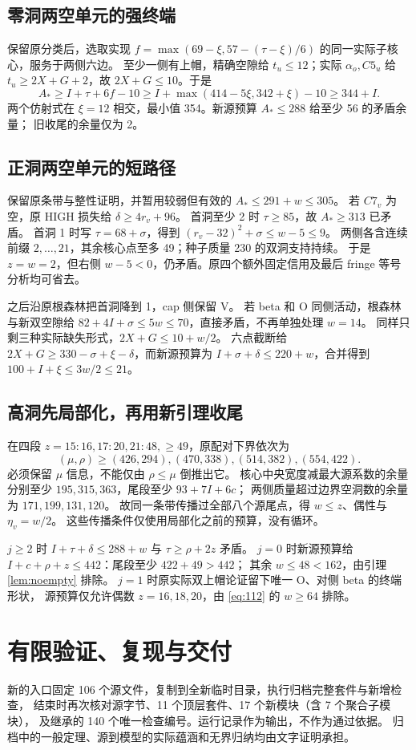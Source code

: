 \documentclass[11pt,a4paper]{article}
\newcommand{\A}{A_*}
\begin{document}
\subsection*{零洞两空单元的强终端}
保留原分类后，选取实现 $f=\max(69-\xi,57-(\tau-\xi)/6)$ 的同一实际子核心，服务于两侧六边。
至少一侧有上帽，精确空隙给 $t_u\le12$；实际 $\alpha_o,C5_u$ 给
$t_u\ge2X+G+2$，故 $2X+G\le10$。于是
\[
\A\ge I+\tau+6f-10\ge I+\max(414-5\xi,342+\xi)-10\ge344+I.
\]
两个仿射式在 $\xi=12$ 相交，最小值 354。新源预算 $\A\le288$ 给至少 56 的矛盾余量；
旧收尾的余量仅为 2。

\subsection*{正洞两空单元的短路径}
保留原条带与整性证明，并暂用较弱但有效的 $\A\le291+w\le305$。
若 $C7_v$ 为空，原 HIGH 损失给 $\delta\ge4r_v+96$。
首洞至少 2 时 $\tau\ge85$，故 $\A\ge313$ 已矛盾。
首洞 1 时写 $\tau=68+\sigma$，得到 $(r_v-32)^2+\sigma\le w-5\le9$。
两侧各含连续前缀 $2,\ldots,21$，其余核心点至多 49；种子质量 230 的双洞支持持续。
于是 $z=w=2$，但右侧 $w-5<0$，仍矛盾。原四个额外固定信用及最后 fringe 等号分析均可省去。

之后沿原根森林把首洞降到 1，cap 侧保留 V。
若 beta 和 O 同侧活动，根森林与新双空隙给
$82+4I+\sigma\le5w\le70$，直接矛盾，不再单独处理 $w=14$。
同样只剩三种实际缺失形式，$2X+G\le10+w/2$。
六点截断给 $2X+G\ge330-\sigma+\xi-\delta$，而新源预算为
$I+\sigma+\delta\le220+w$，合并得到 $100+I+\xi\le3w/2\le21$。

\subsection*{高洞先局部化，再用新引理收尾}
在四段 $z=15{:}16,17{:}20,21{:}48,\ge49$，原配对下界依次为
\[(\mu,\rho)\ge(426,294),(470,338),(514,382),(554,422).\]
必须保留 $\mu$ 信息，不能仅由 $\rho\le\mu$ 倒推出它。
核心中央宽度减最大源系数的余量分别至少 $195,315,363$，尾段至少 $93+7I+6c$；
两侧质量超过边界空洞数的余量为 $171,199,131,120$。
故同一条带传播过全部八个源尾点，得 $w\le z$、偶性与 $\eta_v=w/2$。
这些传播条件仅使用局部化之前的预算，没有循环。

$j\ge2$ 时 $I+\tau+\delta\le288+w$ 与 $\tau\ge\rho+2z$ 矛盾。
$j=0$ 时新源预算给 $I+c+\rho+z\le442$：尾段至少 $422+49>442$；
其余 $w\le48<162$，由引理 \ref{lem:noempty} 排除。
$j=1$ 时原实际双上帽论证留下唯一 O、对侧 beta 的终端形状，
源预算仅允许偶数 $z=16,18,20$，由 \eqref{eq:112} 的 $w\ge64$ 排除。

\section{有限验证、复现与交付}\label{sec:verification}
新的入口固定 106 个源文件，复制到全新临时目录，执行归档完整套件与新增检查，
结束时再次核对源字节、11 个顶层套件、17 个新模块（含 7 个聚合子模块），
及继承的 140 个唯一检查编号。运行记录作为输出，不作为通过依据。
归档中的一般定理、源到模型的实际蕴涵和无界归纳均由文字证明承担。
\end{document}

